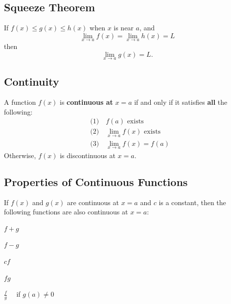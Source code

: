 \documentclass[a4paper,11pt]{article}
\begin{document}


\subsection{Squeeze Theorem}

\begin{tcolorbox}
    If \( f(x) \leq g(x) \leq h(x) \) when \( x \) is near \( a \), and
    \[ \lim\limits_{x \to a} f(x) = \lim\limits_{x \to a} h(x) = L \] then
    \[\lim\limits_{x \to a} g(x) = L.\]
\end{tcolorbox}




\subsection{Continuity}

\begin{tcolorbox}
    A function \( f(x) \) is \textbf{continuous at} \( x = a \) if and only if it satisfies \textbf{all} the following:
    \[
    \begin{aligned}
        &\text{(1)} \quad f(a) \text{ exists} \\  
        &\text{(2)} \quad \lim\limits_{x \to a} f(x) \text{ exists} \\  
        &\text{(3)} \quad \lim\limits_{x \to a} f(x) = f(a)  
    \end{aligned}
    \]
    Otherwise, \( f(x) \) is discontinuous at \( x = a \).
\end{tcolorbox}




\subsection{Properties of Continuous Functions}


\begin{tcolorbox}
    If \( f(x) \) and \( g(x) \) are continuous at \( x = a \) and \( c \) is a constant, then the following functions are also continuous at \( x = a \):  
    \begin{enumerate}
        \begin{multicols}{3}
            \item \(f + g\)
            \item \(f - g\)
            \item \(cf\)
        \end{multicols}
        \begin{multicols}{3}
            \item \(fg\)
            \item \(\displaystyle \frac{f}{g} \quad \) if \( g(a) \neq 0\)
        \end{multicols}
    \end{enumerate}
\end{tcolorbox}
\end{document}
